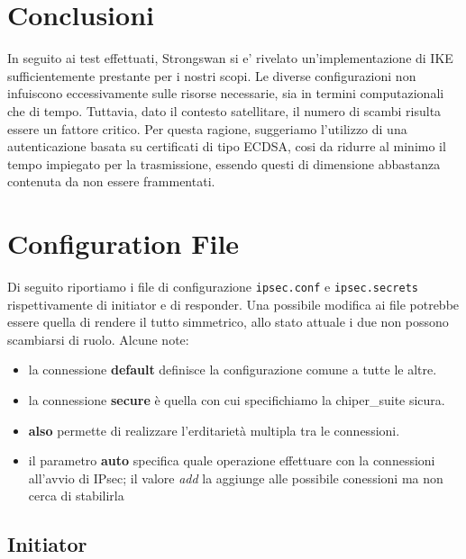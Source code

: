 \documentclass[
10pt, %
a4paper, %
oneside, %
headinclude,footinclude, %
BCOR5mm, %
]{scrartcl}
\begin{document}
\section{Conclusioni}
In seguito ai test effettuati, Strongswan si e' rivelato un'implementazione di IKE sufficientemente prestante per i nostri scopi. Le diverse configurazioni non infuiscono eccessivamente sulle risorse necessarie, sia in termini computazionali che di tempo. Tuttavia, dato il contesto satellitare, il numero di scambi risulta essere un fattore critico. Per questa ragione, suggeriamo l'utilizzo di una autenticazione basata su certificati di tipo ECDSA, cosi da ridurre al minimo il tempo impiegato per la trasmissione, essendo questi di dimensione abbastanza contenuta da non essere frammentati.
\newpage
\appendix

\section{Configuration File}
\hypertarget{configuration}{}
Di seguito riportiamo i file di configurazione \lstinline|ipsec.conf| e \lstinline|ipsec.secrets| rispettivamente di 
initiator e di responder. Una possibile modifica ai file potrebbe essere quella di rendere il tutto simmetrico, allo stato 
attuale i due non possono scambiarsi di ruolo. Alcune note:

\begin{itemize}
    \item la connessione \textbf{default} definisce la configurazione comune a tutte le altre.
    \item la connessione \textbf{secure} è quella con cui specifichiamo la chiper\_suite sicura.
    \item \textbf{also} permette di realizzare l'erditarietà multipla tra le connessioni.
    \item il parametro \textbf{auto} specifica quale operazione effettuare con la connessioni all'avvio di IPsec; il valore \textit{add} la aggiunge alle possibile conessioni ma non cerca di stabilirla
\end{itemize}

\subsection{Initiator}
\end{document}
